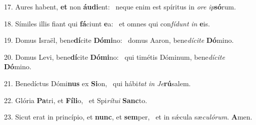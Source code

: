 17. Aures habent, \textbf{et} non \textbf{áu}\textbf{di}ent: \ast\  neque enim est spíritus in \textit{o}\textit{re} \textit{ip}\textbf{só}rum.\

18. Símiles illis fiant qui \textbf{fá}ciunt \textbf{e}a: \ast\  et omnes qui con\textit{fí}\textit{dunt} \textit{in} \textbf{e}is.\

19. Domus Israël, bene\textbf{dí}cite \textbf{Dó}\textbf{mi}no: \ast\  domus Aaron, bene\textit{dí}\textit{ci}\textit{te} \textbf{Dó}mino.\

20. Domus Levi, bene\textbf{dí}cite \textbf{Dó}\textbf{mi}no: \ast\  qui timétis Dóminum, bene\textit{dí}\textit{ci}\textit{te} \textbf{Dó}mino.\

21. Benedíctus Dómi\textbf{nus} ex \textbf{Si}on, \ast\  qui hábi\textit{tat} \textit{in} \textit{Je}\textbf{rú}salem.\

22. Glória \textbf{Pa}tri, et \textbf{Fí}\textbf{li}o, \ast\  et Spi\textit{rí}\textit{tu}\textit{i} \textbf{Sanc}to.\

23. Sicut erat in princípio, et \textbf{nunc}, et \textbf{sem}per, \ast\  et in sǽcula sæ\textit{cu}\textit{ló}\textit{rum}. \textbf{A}men.\

